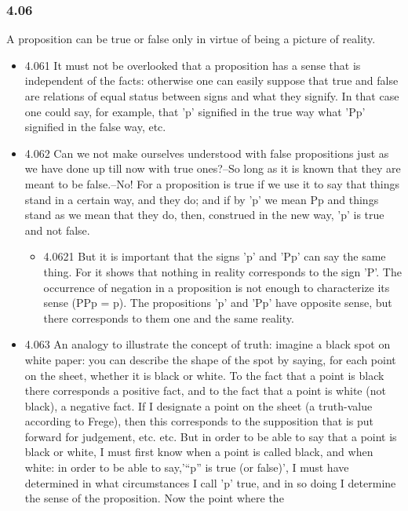 \documentclass[11pt]{article}
\begin{document}
\subsubsection*{4.06}
\label{sec:org5fbd581}
A proposition can be true or false only in virtue of being a picture
of reality.
\begin{itemize}
\item 4.061
\label{sec:orgeaeec7a}
It must not be overlooked that a proposition has a sense that is
independent of the facts: otherwise one can easily suppose that true and
false are relations of equal status between signs and what they signify. In
that case one could say, for example, that 'p' signified in the true way
what 'Pp' signified in the false way, etc.
\item 4.062
\label{sec:orge721a74}
Can we not make ourselves understood with false propositions just as
we have done up till now with true ones?--So long as it is known that they
are meant to be false.--No! For a proposition is true if we use it to say
that things stand in a certain way, and they do; and if by 'p' we mean Pp
and things stand as we mean that they do, then, construed in the new way,
'p' is true and not false.
\begin{itemize}
\item 4.0621
\label{sec:org75009cc}
But it is important that the signs 'p' and 'Pp' can say the same
thing. For it shows that nothing in reality corresponds to the sign 'P'.
The occurrence of negation in a proposition is not enough to characterize
its sense (PPp = p). The propositions 'p' and 'Pp' have opposite sense, but
there corresponds to them one and the same reality.
\end{itemize}
\item 4.063
\label{sec:org0226ec7}
An analogy to illustrate the concept of truth: imagine a black spot
on white paper: you can describe the shape of the spot by saying, for each
point on the sheet, whether it is black or white. To the fact that a point
is black there corresponds a positive fact, and to the fact that a point is
white (not black), a negative fact. If I designate a point on the sheet (a
truth-value according to Frege), then this corresponds to the supposition
that is put forward for judgement, etc. etc. But in order to be able to say
that a point is black or white, I must first know when a point is called
black, and when white: in order to be able to say,'``p'' is true (or false)',
I must have determined in what circumstances I call 'p' true, and in so
doing I determine the sense of the proposition. Now the point where the

\end{itemize}
\end{document}

